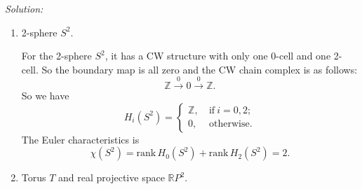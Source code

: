 \documentclass[a4paper, 12pt]{article}
\newenvironment{solution}
    {\textit{Solution:}}
    {}
\newcommand{\rank}{\text{rank}\,}
\begin{document}
\begin{solution}

\begin{enumerate}[(1)]
\item 2-sphere \(S^2\).

For the 2-sphere \(S^2\), it has a CW structure with only one 0-cell and one 2-cell. So the boundary map is all zero and the CW chain complex is as follows: 
\[\mathbb{Z}\xrightarrow{0} 0\xrightarrow{0} \mathbb{Z}.\]
So we have 
\[H_i(S^2)=\begin{cases}
    \mathbb{Z},&\ \text{if}\  i=0,2;\\ 
    0,&\ \text{otherwise}.
\end{cases}\]
The Euler characteristics is 
\[\chi(S^2)=\rank H_0(S^2)+\rank H_2(S^2)=2.\]
\item Torus \(T\) and real projective space \(\mathbb{R}P^2\). 


\end{enumerate}
\end{solution}
\end{document}
